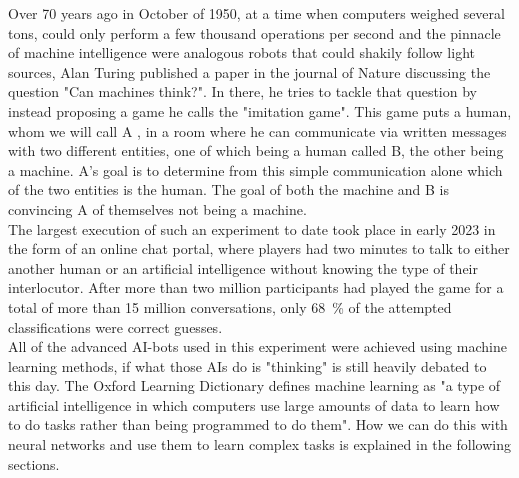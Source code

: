 Over 70 years ago in October of 1950, at a time when computers weighed several tons, could only perform a few thousand operations per second and the pinnacle of machine intelligence were analogous robots that could shakily follow light sources\cite{FirstThinkingMachinesArticle}, Alan Turing published a paper in the journal of Nature discussing the question "Can machines think?"\cite{TuringThinkingPaper}. In there, he tries to tackle that question by instead proposing a game he calls the "imitation game". This game puts a human, whom we will call A , in a room where he can communicate via written messages with two different entities, one of which being a human called B, the other being a machine. A's goal is to determine from this simple communication alone which of the two entities is the human. The goal of both the machine and B is convincing A of themselves not being a machine.\\
The largest execution of such an experiment to date took place in early 2023 in the form of an online chat portal, where players had two minutes to talk to either another human or an artificial intelligence without knowing the type of their interlocutor. After more than two million participants had played the game for a total of more than 15 million conversations, only \SI{68}{\percent} of the attempted classifications were correct guesses. \\
All of the advanced AI-bots used in this experiment were achieved using machine learning methods, if what those AIs do is "thinking" is still heavily debated to this day. The Oxford Learning Dictionary defines machine learning as "a type of artificial intelligence in which computers use large amounts of data to learn how to do tasks rather than being programmed to do them"\cite{MLDefinition}. How we can do this with neural networks and use them to learn complex tasks is explained in the following sections.

